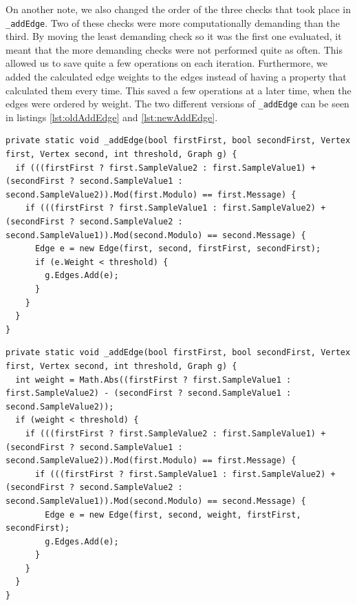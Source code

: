 On another note, we also changed the order of the three checks that took place in \lstinline|_addEdge|.
Two of these checks were more computationally demanding than the third.
By moving the least demanding check so it was the first one evaluated, it meant that the more demanding checks were not performed quite as often.
This allowed us to save quite a few operations on each iteration.
Furthermore, we added the calculated edge weights to the edges instead of having a property that calculated them every time.
This saved a few operations at a later time, when the edges were ordered by weight.
The two different versions of \lstinline|_addEdge| can be seen in listings \ref{lst:oldAddEdge} and \ref{lst:newAddEdge}.

\begin{lstlisting}[firstnumber=478,label=lst:oldAddEdge, caption={The original \lstinline|_addEdge| method.
\textbf{File:} first\textunderscore  round/CS/JPEGImage.cs.}]
private static void _addEdge(bool firstFirst, bool secondFirst, Vertex first, Vertex second, int threshold, Graph g) {
  if (((firstFirst ? first.SampleValue2 : first.SampleValue1) + (secondFirst ? second.SampleValue1 : second.SampleValue2)).Mod(first.Modulo) == first.Message) {
    if (((firstFirst ? first.SampleValue1 : first.SampleValue2) + (secondFirst ? second.SampleValue2 : second.SampleValue1)).Mod(second.Modulo) == second.Message) {
      Edge e = new Edge(first, second, firstFirst, secondFirst);
      if (e.Weight < threshold) {
        g.Edges.Add(e);
      }
    }
  }
}
\end{lstlisting}

\begin{lstlisting}[firstnumber=482,label=lst:newAddEdge, caption={The improved \lstinline|_addEdge| method.
\textbf{File:} second\textunderscore  round/CS/JPEGImage.cs.}]
private static void _addEdge(bool firstFirst, bool secondFirst, Vertex first, Vertex second, int threshold, Graph g) {
  int weight = Math.Abs((firstFirst ? first.SampleValue1 : first.SampleValue2) - (secondFirst ? second.SampleValue1 : second.SampleValue2));
  if (weight < threshold) {
    if (((firstFirst ? first.SampleValue2 : first.SampleValue1) + (secondFirst ? second.SampleValue1 : second.SampleValue2)).Mod(first.Modulo) == first.Message) {
      if (((firstFirst ? first.SampleValue1 : first.SampleValue2) + (secondFirst ? second.SampleValue2 : second.SampleValue1)).Mod(second.Modulo) == second.Message) {
        Edge e = new Edge(first, second, weight, firstFirst, secondFirst);
        g.Edges.Add(e);
      }
    }
  }
}
\end{lstlisting}

